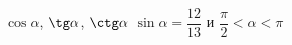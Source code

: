 \begin{ex}[type=calculate_expression]
	\begin{condition}
		\( \cos\alpha \), \( \tg\alpha \), \( \ctg\alpha \) \quad \( \sin\alpha=\dfrac{12}{13} \) и \( \dfrac{\pi}{2}<\alpha<\pi \)
	\end{condition}
\end{ex}